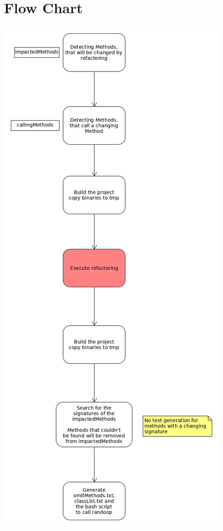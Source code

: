 \documentclass[accentcolor=tud9c, colorback]{tudreport}
\begin{document}
	\chapter{Flow Chart}
		\includegraphics[height=\textheight-100pt]{Ablaufdiagramm.jpg}
\end{document}
